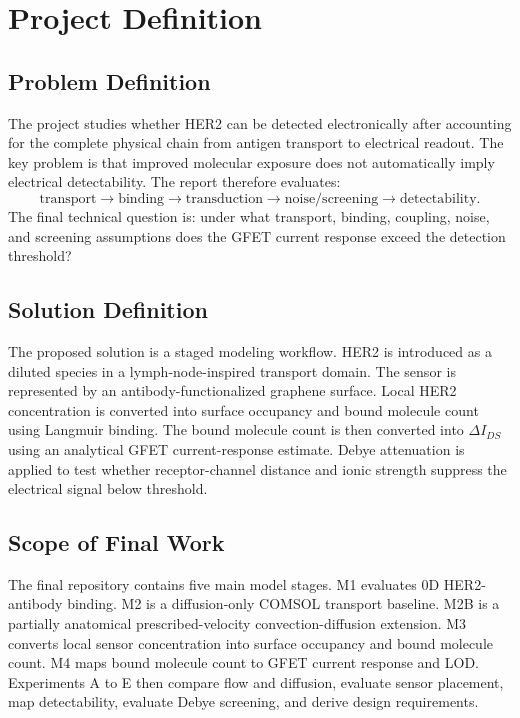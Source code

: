 ﻿\documentclass[12pt,a4paper,oneside]{report}
\begin{document}
\chapter{Project Definition}

\section{Problem Definition}
The project studies whether HER2 can be detected electronically after accounting for the complete physical chain from antigen transport to electrical readout. The key problem is that improved molecular exposure does not automatically imply electrical detectability. The report therefore evaluates:
\[
\text{transport}\rightarrow\text{binding}\rightarrow\text{transduction}\rightarrow\text{noise/screening}\rightarrow\text{detectability}.
\]
The final technical question is: under what transport, binding, coupling, noise, and screening assumptions does the GFET current response exceed the detection threshold?

\section{Solution Definition}
The proposed solution is a staged modeling workflow. HER2 is introduced as a diluted species in a lymph-node-inspired transport domain. The sensor is represented by an antibody-functionalized graphene surface. Local HER2 concentration is converted into surface occupancy and bound molecule count using Langmuir binding. The bound molecule count is then converted into $\Delta I_{DS}$ using an analytical GFET current-response estimate. Debye attenuation is applied to test whether receptor-channel distance and ionic strength suppress the electrical signal below threshold.

\section{Scope of Final Work}
The final repository contains five main model stages. M1 evaluates 0D HER2-antibody binding. M2 is a diffusion-only COMSOL transport baseline. M2B is a partially anatomical prescribed-velocity convection-diffusion extension. M3 converts local sensor concentration into surface occupancy and bound molecule count. M4 maps bound molecule count to GFET current response and LOD. Experiments A to E then compare flow and diffusion, evaluate sensor placement, map detectability, evaluate Debye screening, and derive design requirements.
\end{document}

